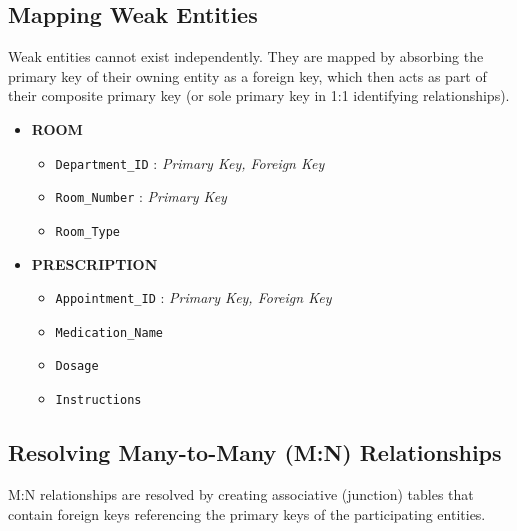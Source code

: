 \documentclass[12pt,a4paper]{article}
\begin{document}
\subsection{Mapping Weak Entities}
Weak entities cannot exist independently. They are mapped by absorbing the primary key of their owning entity as a foreign key, which then acts as part of their composite primary key (or sole primary key in 1:1 identifying relationships).

\begin{itemize}[label=\textbf{--}]

	\item \textbf{ROOM}
	      \begin{itemize}[label=$\bullet$]
		      \item \texttt{Department\_ID} : \textit{Primary Key, Foreign Key}
		      \item \texttt{Room\_Number} : \textit{Primary Key}
		      \item \texttt{Room\_Type}
	      \end{itemize}

	\item \textbf{PRESCRIPTION}
	      \begin{itemize}[label=$\bullet$]
		      \item \texttt{Appointment\_ID} : \textit{Primary Key, Foreign Key}
		      \item \texttt{Medication\_Name}
		      \item \texttt{Dosage}
		      \item \texttt{Instructions}
	      \end{itemize}

\end{itemize}

\subsection{Resolving Many-to-Many (M:N) Relationships}
M:N relationships are resolved by creating associative (junction) tables that contain foreign keys referencing the primary keys of the participating entities.
\end{document}
